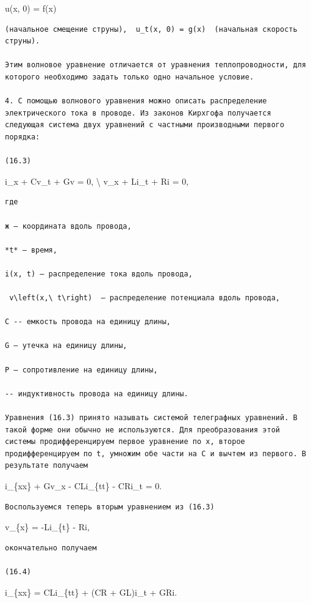 \documentclass[
  ukrainian,
]{article}
\begin{document}
u(x, 0) = f(x)

\begin{verbatim}
(начальное смещение струны),  u_t(x, 0) = g(x)  (начальная скорость струны).

Этим волновое уравнение отличается от уравнения теплопроводности, для которого необходимо задать только одно начальное условие.

4. С помощью волнового уравнения можно описать распределение электрического тока в проводе. Из законов Кирхгофа получается следующая система двух уравнений с частными производными первого порядка:

(16.3)
\end{verbatim}

i\_x + Cv\_t + Gv = 0, \textbackslash{} v\_x + Li\_t + Ri = 0,

\begin{verbatim}
где

ж — координата вдоль провода,

*t* — время,

i(x, t) — распределение тока вдоль провода,

 v\left(x,\ t\right)  — распределение потенциала вдоль провода,

С -- емкость провода на единицу длины,

G — утечка на единицу длины,

Р — сопротивление на единицу длины,

-- индуктивность провода на единицу длины.

Уравнения (16.3) принято называть системой телеграфных уравнений. В такой форме они обычно не используются. Для преобразования этой системы продифференцируем первое уравнение по x, второе продифференцируем по t, умножим обе части на C и вычтем из первого. В результате получаем
\end{verbatim}

i\_\{xx\} + Gv\_x - CLi\_\{tt\} - CRi\_t = 0.

\begin{verbatim}
Воспользуемся теперь вторым уравнением из (16.3)
\end{verbatim}

v\_\{x\} = -Li\_\{t\} - Ri,

\begin{verbatim}
окончательно получаем

(16.4)
\end{verbatim}

i\_\{xx\} = CLi\_\{tt\} + (CR + GL)i\_t + GRi.
\end{document}
